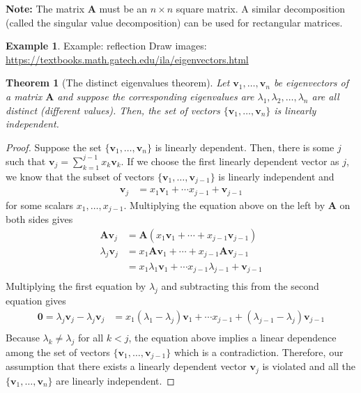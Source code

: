 \documentclass[
]{book}
\newtheorem{theorem}{Theorem}[chapter]
\theoremstyle{definition}
\theoremstyle{definition}
\newtheorem{example}{Example}[chapter]
\theoremstyle{definition}
\theoremstyle{definition}
\theoremstyle{remark}
\begin{document}
\textbf{Note:} The matrix \(\mathbf{A}\) must be an \(n \times n\) square matrix. A similar decomposition (called the singular value decomposition) can be used for rectangular matrices.

\begin{example}
Example: reflection
Draw images: \url{https://textbooks.math.gatech.edu/ila/eigenvectors.html}
\end{example}

\begin{theorem}[The distinct eigenvalues theorem]
\protect\hypertarget{thm:distinct-eigenvalues}{}\label{thm:distinct-eigenvalues}Let \(\mathbf{v}_1, \ldots, \mathbf{v}_n\) be eigenvectors of a matrix \(\mathbf{A}\) and suppose the corresponding eigenvalues are \(\lambda_1, \lambda_2, \ldots, \lambda_n\) are all distinct (different values). Then, the set of vectors \(\{\mathbf{v}_1, \ldots, \mathbf{v}_n\}\) is linearly independent.
\end{theorem}

\begin{proof}
Suppose the set \(\{\mathbf{v}_1, \ldots, \mathbf{v}_n\}\) is linearly dependent. Then, there is some \(j\) such that \(\mathbf{v}_j = \sum_{k = 1}^{j-1} x_k \mathbf{v}_k\). If we choose the first linearly dependent vector as \(j\), we know that the subset of vectors \(\{\mathbf{v}_1, \ldots, \mathbf{v}_{j-1}\}\) is linearly independent and
\[
\begin{aligned}
\mathbf{v}_j & = x_1 \mathbf{v}_1 + \cdots x_{j-1} + \mathbf{v}_{j-1}
\end{aligned}
\]
for some scalars \(x_1, \ldots, x_{j-1}\). Multiplying the equation above on the left by \(\mathbf{A}\) on both sides gives
\[
\begin{aligned}
\mathbf{A}\mathbf{v}_j & = \mathbf{A} (x_1 \mathbf{v}_1 + \cdots + x_{j-1} \mathbf{v}_{j-1}) \\
\lambda_j \mathbf{v}_j & = x_1 \mathbf{A} \mathbf{v}_1 + \cdots + x_{j-1} \mathbf{A} \mathbf{v}_{j-1} \\
& =  x_1 \lambda_1 \mathbf{v}_1 + \cdots x_{j-1} \lambda_{j-1} + \mathbf{v}_{j-1} \\
\end{aligned}
\]
Multiplying the first equation by \(\lambda_j\) and subtracting this from the second equation gives
\[
\begin{aligned}
\mathbf{0} = \lambda_j \mathbf{v}_j - \lambda_j \mathbf{v}_j 
& = x_1 (\lambda_1 - \lambda_j) \mathbf{v}_1 + \cdots x_{j-1} + (\lambda_{j-1} - \lambda_j) \mathbf{v}_{j-1} \\
\end{aligned}
\]
Because \(\lambda_k \neq \lambda_j\) for all \(k < j\), the equation above implies a linear dependence among the set of vectors \(\{\mathbf{v}_1, \ldots, \mathbf{v}_{j-1}\}\) which is a contradiction. Therefore, our assumption that there exists a linearly dependent vector \(\mathbf{v}_j\) is violated and all the \(\{\mathbf{v}_1, \ldots, \mathbf{v}_n\}\) are linearly independent.
\end{proof}
\end{document}
